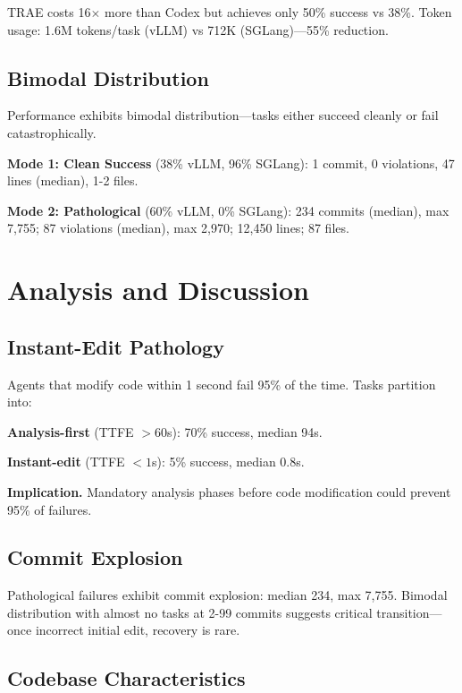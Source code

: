 \documentclass{article}
\theoremstyle{plain}
\theoremstyle{definition}
\theoremstyle{remark}
\begin{document}
TRAE costs 16$\times$ more than Codex but achieves only 50\% success vs 38\%. Token usage: 1.6M tokens/task (vLLM) vs 712K (SGLang)---55\% reduction.

\subsection{Bimodal Distribution}

Performance exhibits bimodal distribution---tasks either succeed cleanly or fail catastrophically.

\textbf{Mode 1: Clean Success} (38\% vLLM, 96\% SGLang): 1 commit, 0 violations, 47 lines (median), 1-2 files.

\textbf{Mode 2: Pathological} (60\% vLLM, 0\% SGLang): 234 commits (median), max 7,755; 87 violations (median), max 2,970; 12,450 lines; 87 files.

\section{Analysis and Discussion}
\label{sec:analysis}

\subsection{Instant-Edit Pathology}

Agents that modify code within 1 second fail 95\% of the time. Tasks partition into:

\textbf{Analysis-first} (TTFE $> 60$s): 70\% success, median 94s.

\textbf{Instant-edit} (TTFE $< 1$s): 5\% success, median 0.8s.

\textbf{Implication.} Mandatory analysis phases before code modification could prevent 95\% of failures.

\subsection{Commit Explosion}

Pathological failures exhibit commit explosion: median 234, max 7,755. Bimodal distribution with almost no tasks at 2-99 commits suggests critical transition---once incorrect initial edit, recovery is rare.

\subsection{Codebase Characteristics}
\end{document}
